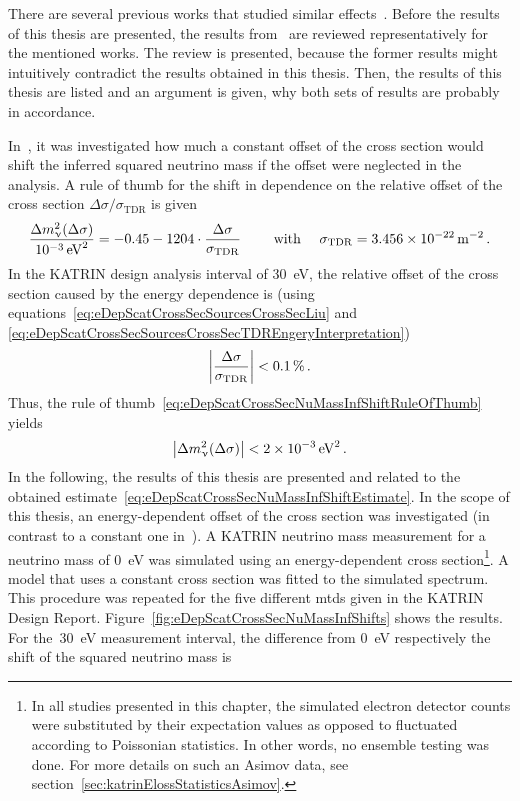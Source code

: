 There are several previous works that studied similar effects~\cite{Antoni2015,Groh2015,SeitzM2019,Kuckert2016,Kuckert2018}. Before the results of this thesis are presented, the results from~\cite{Groh2015} are reviewed representatively for the mentioned works. The review is presented, because the former results might intuitively contradict the results obtained in this thesis. Then, the results of this thesis are listed and an argument is given, why both sets of results are probably in accordance.

In~\cite{Groh2015}, it was investigated how much a constant offset of the cross section would shift the inferred squared neutrino mass if the offset were neglected in the analysis. A rule of thumb for the shift in dependence on the relative offset of the cross section $\Delta\sigma/\sigma_\mathrm{TDR}$ is given~\cite{Groh2015}
\begin{equation}
	\label{eq:eDepScatCrossSecNuMassInfShiftRuleOfThumb}
	\frac{\Delta m_\upnu^2(\Delta\sigma)}{\SI{e-3}{eV^2}} =
	-0.45
	-1204\cdot
	\frac{
		\Delta\sigma
	}{
		\sigma_\mathrm{TDR}
	}
	\qquad \text{ with } \quad 
	\sigma_\mathrm{TDR} = \SI{3.456e-22}{m^{-2}}
	\text{\,.}
\end{equation}
In the KATRIN design analysis interval of \SI{30}{eV}, the relative offset of the cross section caused by the energy dependence is (using equations~\ref{eq:eDepScatCrossSecSourcesCrossSecLiu} and \ref{eq:eDepScatCrossSecSourcesCrossSecTDREngeryInterpretation})
\begin{equation}
	\label{eq:eDepScatCrossSecNuMassInfRelativeCrossSecOffset}
	\left|
	\frac{
		\Delta\sigma
	}{
		\sigma_\mathrm{TDR}
	}
	\right| < \SI{0.1}{\percent}
	\text{\,.}
\end{equation}
Thus, the rule of thumb~\eqref{eq:eDepScatCrossSecNuMassInfShiftRuleOfThumb} yields
\begin{equation}
	\label{eq:eDepScatCrossSecNuMassInfShiftEstimate}
	\left|
		\Delta m_\upnu^2(\Delta\sigma)
	\right| < \SI{2e-3}{eV^2} 
	\text{\,.}
\end{equation}
In the following, the results of this thesis are presented and related to the obtained estimate~\eqref{eq:eDepScatCrossSecNuMassInfShiftEstimate}.
In the scope of this thesis, an energy-dependent offset of the cross section was investigated (in contrast to a constant one in~\cite{Groh2015}). A KATRIN neutrino mass measurement for a neutrino mass of \SI{0}{eV} was simulated using an energy-dependent cross section\footnote{In all studies presented in this chapter, the simulated electron detector counts were substituted by their expectation values as opposed to fluctuated according to Poissonian statistics. In other words, no ensemble testing was done. For more details on such an Asimov data, see section~\ref{sec:katrinElossStatisticsAsimov}.}. A model that uses a constant cross section was fitted to the simulated spectrum. This procedure was repeated for the five different \gls{mtd}s given in the KATRIN Design Report. Figure~\ref{fig:eDepScatCrossSecNuMassInfShifts} shows the results. For the~\SI{30}{eV} measurement interval, the difference from \SI{0}{eV} respectively the shift of the squared neutrino mass is
